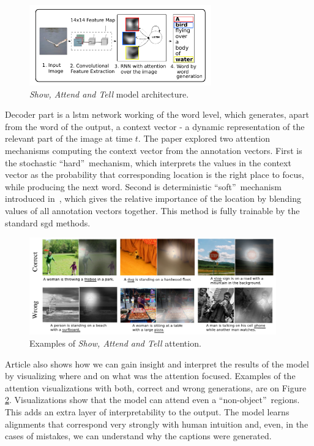 \begin{figure}[!t]
	\centering
	\includegraphics[width=0.7\textwidth]{./fig/show-attend-tell_model.pdf}
	\caption{\emph{Show, Attend and Tell} model architecture.~\cite{DBLP:journals/corr/XuBKCCSZB15}
		\label{fig:attendmodel}}
\end{figure}

Decoder part is a \gls{lstm} network working of the word level, which generates, apart from the word of the output, a context vector - a dynamic representation of the relevant part of the image at time $ t $. The paper explored two attention mechanisms computing the context vector from the annotation vectors. First is the stochastic \textquotedblleft hard\textquotedblright\ mechanism, which interprets the values in the context vector as the probability that corresponding location is the right place to focus, while producing the next word. Second is deterministic \textquotedblleft soft\textquotedblright\ mechanism introduced in~\cite{DBLP:journals/corr/BahdanauCB14}, which gives the relative importance of the location by blending values of all annotation vectors together. This method is fully trainable by the standard \gls{sgd} methods.

\begin{figure}[!t]
	\centering
	\includegraphics[width=0.95\textwidth]{./fig/show-attend-tell_example.pdf}
	\caption{Examples of \emph{Show, Attend and Tell} attention.~\cite{DBLP:journals/corr/XuBKCCSZB15}
		\label{fig:attendexample}}
\end{figure}

Article also shows how we can gain insight and interpret the results of the model by visualizing where and on what was the attention focused. Examples of the attention visualizations with both, correct and wrong generations, are on Figure \ref{fig:attendexample}. Visualizations show that the model can attend even a \textquotedblleft non-object\textquotedblright\ regions. This adds an extra layer of interpretability to the output. The model learns alignments that correspond very strongly with human intuition and, even, in the cases of mistakes, we can understand why the captions were generated.

